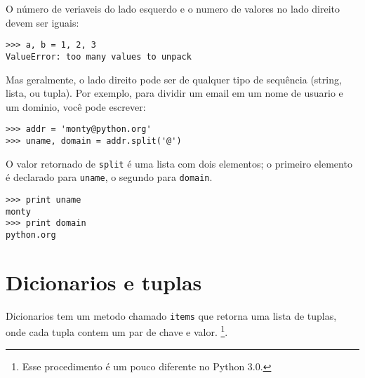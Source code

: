 O número de veriaveis do lado esquerdo e o numero de valores
no lado direito devem ser iguais:


\beforeverb
\begin{verbatim}
>>> a, b = 1, 2, 3
ValueError: too many values to unpack
\end{verbatim}
\afterverb
%
Mas geralmente, o lado direito pode ser de qualquer tipo de sequência
(string, lista, ou tupla). Por exemplo, para dividir um email em
um nome de usuario e um dominio, você pode escrever:


\beforeverb
\begin{verbatim}
>>> addr = 'monty@python.org'
>>> uname, domain = addr.split('@')
\end{verbatim}
\afterverb
%
O valor retornado de {\tt split} é uma lista com dois elementos;
o primeiro elemento é declarado para {\tt uname}, o segundo para
{\tt domain}.

\beforeverb
\begin{verbatim}
>>> print uname
monty
>>> print domain
python.org
\end{verbatim}
\afterverb
%

\section{Dicionarios e tuplas}


Dicionarios tem um metodo chamado {\tt items} que retorna uma lista de
tuplas, onde cada tupla contem um par de chave e valor.
\footnote{Esse procedimento é um pouco diferente no Python 3.0.}.

